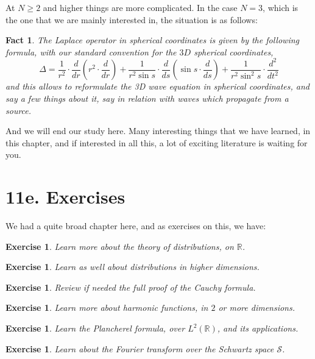 \documentclass[12pt]{amsbook}
\newtheorem{exercise}[theorem]{Exercise}
\newtheorem{fact}[theorem]{Fact}
\begin{document}
At $N\geq2$ and higher things are more complicated. In the case $N=3$, which is the one that we are mainly interested in, the situation is as follows:


\begin{fact}
The Laplace operator in spherical coordinates is given by the following formula, with our standard convention for the $3D$ spherical coordinates,
$$\Delta=\frac{1}{r^2}\cdot\frac{d}{dr}\left(r^2\cdot\frac{d}{dr}\right)
+\frac{1}{r^2\sin s}\cdot\frac{d}{ds}\left(\sin s\cdot\frac{d}{ds}\right)
+\frac{1}{r^2\sin^2s}\cdot\frac{d^2}{dt^2}$$
and this allows to reformulate the 3D wave equation in spherical coordinates, and say a few things about it, say in relation with waves which propagate from a source. 
\end{fact}

And we will end our study here. Many interesting things that we have learned, in this chapter, and  if interested in all this, a lot of exciting literature is waiting for you.

\section*{11e. Exercises}

We had a quite broad chapter here, and as exercises on this, we have:

\begin{exercise}
Learn more about the theory of distributions, on $\mathbb R$.
\end{exercise}

\begin{exercise}
Learn as well about distributions in higher dimensions.
\end{exercise}

\begin{exercise}
Review if needed the full proof of the Cauchy formula.
\end{exercise}

\begin{exercise}
Learn more about harmonic functions, in $2$ or more dimensions.
\end{exercise}

\begin{exercise}
Learn the Plancherel formula, over $L^2(\mathbb R)$, and its applications.
\end{exercise}

\begin{exercise}
Learn about the Fourier transform over the Schwartz space $\mathcal S$.
\end{exercise}
\end{document}
